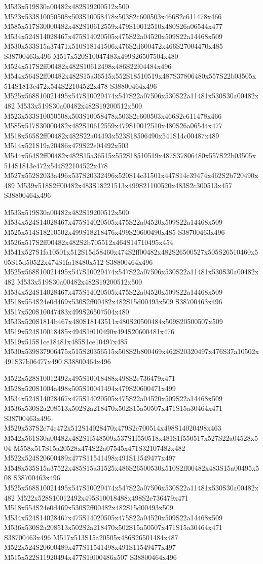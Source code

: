\documentclass{article}
\begin{document}
\begin{multicols}{2}
M533x519S30a00482x482S19200512x500 M523x533S10050508x503S10058478x503S2c600503x466S2c611478x466 M585x517S30000482x482S10612559x479S10012510x480S26a06544x477 M534x524S14028467x475S14020505x475S22a04520x509S22a14468x509 M530x533S15a37471x510S18141506x476S2d600472x466S27004470x485 S38700463x496 M517x520S10047483x499S26507504x480 M524x517S2ff00482x482S10612498x486S22f04484x496 M544x564S2ff00482x482S15a36515x552S18510519x487S37806480x557S22b03505x514S1813e472x544S22104522x478 S38800464x496 M525x568S10021495x547S10029474x547S22a07506x530S22a11481x530S30a00482x482 M533x519S30a00482x482S19200512x500 M523x533S10050508x503S10058478x503S2c600503x466S2c611478x466 M585x517S30000482x482S10612559x479S10012510x480S26a06544x477 M518x565S2ff00482x482S22a04493x523S18506490x541S14c00487x489 M514x521S19a20486x479S22e04492x503 M544x564S2ff00482x482S15a36515x552S18510519x487S37806480x557S22b03505x514S1813e472x544S22104522x478 M527x552S2033a496x537S20332496x520S14c31501x447S14c39474x462S2b720490x489 M539x518S2ff00482x483S18221513x499S21100520x483S2c300513x457 S38800464x496

M533x519S30a00482x482S19200512x500 M534x524S14028467x475S14020505x475S22a04520x509S22a14468x509 M525x514S18210502x499S18218476x499S20600490x485 S38700463x496 M526x517S2ff00482x482S2b705512x464S14710495x454 M541x527S1fa10501x512S15d58460x474S2ff00482x482S26500527x505S26510460x505S15d50522x474S1fa18480x512 S38800464x496 M525x568S10021495x547S10029474x547S22a07506x530S22a11481x530S30a00482x482 M533x519S30a00482x482S19200512x500 M534x524S14028467x475S14020505x475S22a04520x509S22a14468x509 M518x554S24e0d469x530S2ff00482x482S15d00493x509 S38700463x496 M517x520S10047483x499S26507504x480 M533x520S1814b467x480S18143511x480S20500484x509S20500507x509 M519x524S10018485x494S1f010490x494S20600481x476 M519x515S1ce18481x485S1ce10497x485 M530x539S37906475x515S20356515x508S2b800469x462S20320497x476S37a10502x491S37b06477x490 S38800464x496

M522x528S10012492x495S10018488x498S2e736479x471 M528x520S1004a498x505S10041494x479S20600471x499 M534x524S14028467x475S14020505x475S22a04520x509S22a14468x509 M536x530S2a208513x502S2a218470x502S15a50507x471S15a30464x471 S38700463x496 M529x537S2e74c472x512S14028470x479S2e700514x498S14020498x463 M542x561S30a00482x482S1f548509x537S1f550518x481S1f550517x527S22a04528x504 M558x517S15a20528x474S22a07545x471S32107482x482 M522x524S20600489x477S11541498x491S11549477x497 M548x535S15a37522x485S15a31525x486S26500530x510S2ff00482x483S15a00495x508 S38700463x496 M525x568S10021495x547S10029474x547S22a07506x530S22a11481x530S30a00482x482 M522x528S10012492x495S10018488x498S2e736479x471 M518x554S24e0d469x530S2ff00482x482S15d00493x509 M534x524S14028467x475S14020505x475S22a04520x509S22a14468x509 M536x530S2a208513x502S2a218470x502S15a50507x471S15a30464x471 S38700463x496 M517x513S15a20505x486S26501484x487 M522x524S20600489x477S11541498x491S11549477x497 M515x522S11920494x477S1f000486x507 S38800464x496


\end{multicols}
\end{document}
